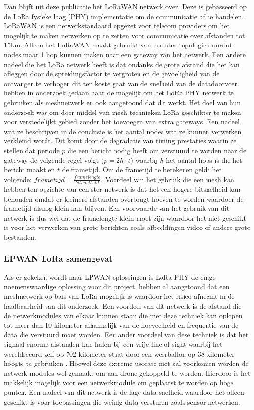 \documentclass[a4paper, 11pt, oneside]{report}
\begin{document}
Dan blijft uit deze publicatie het LoRaWAN netwerk over. 
Deze is gebasseerd op de LoRa fysieke laag (PHY)\cite{LoRAMOD} implementatie om de communicatie af te handelen.
LoRaWAN is een netwerkstandaard opgezet voor telecom providers om het mogelijk te maken netwerken op te zetten voor communicatie over afstanden tot 15km.
Alleen het LoRaWAN maakt gebruikt van een ster topologie doordat nodes maar 1 hop kunnen maken naar een gateway van het netwerk.
Een andere nadeel die het LoRa netwerk heeft is dat ondanks de grote afstand die het kan afleggen door de spreidingsfactor te vergroten en de gevoeligheid van de ontvanger te verhogen dit ten koste gaat van de snelheid van de datadoorvoer.
 hebben in onderzoek gedaan naar de mogelijk om het LoRa PHY netwerk te gebruiken als meshnetwerk en ook aangetoond dat dit werkt.
Het doel van hun onderzoek was om door middel van mesh technieken LoRa geschikter te maken voor verstedelijkt gebied zonder het toevoegen van extra gateways. 
Een nadeel wat ze beschrijven in de conclusie is het aantal nodes wat ze kunnen verwerken verkleind wordt.
Dit komt door de degradatie van timing prestaties waarin ze stellen dat periode $p$ die een bericht nodig heeft om verstuurd te worden naar de gateway de volgende regel volgt ($p = 2h\cdot t$) waarbij $h$ het aantal hops is die het bericht maakt en $t$ de frametijd. Om de frametijd te berekenen geldt het volgende: $frametijd = \frac{framelengte}{bitsnelheid}$. 
Voordeel van het gebruik die een mesh kan hebben ten opzichte van een ster netwerk is dat het een hogere bitsnelheid kan behouden omdat er kleinere afstanden overbrugt hoeven te worden waardoor de frametijd alsnog klein kan blijven.
Een voorwaarde van het gebruik van dit netwerk is dus wel dat de framelengte klein moet zijn waardoor het niet geschikt is voor het verwerken van grote berichten zoals afbeeldingen video of andere grote bestanden.

\subsubsection*{LPWAN LoRa samengevat}
Als er gekeken wordt naar LPWAN oplossingen is LoRa PHY de enige noemenswaardige oplossing voor dit project.
 hebben al aangetoond dat een meshnetwerk op bais van LoRa mogelijk is waardoor het risico afneemt in de haalbaarheid van dit onderzoek.
Een voordeel van dit netwerk is de afstand die de netwerkmodules van elkaar kunnen staan die met deze techniek kan oplopen tot meer dan 10 kilometer afhankelijk van de hoeveelheid en frequentie van de data die verstuurd moet worden.
Een ander voordeel van deze techniek is dat het signaal enorme afstanden kan halen bij een vrije line of sight waarbij het wereldrecord zelf op 702 kilometer staat door een weerballon op 38 kilometer hoogte te gebruiken \cite{LoRARecord}.
Hoewel deze extreme usecase niet zal voorkomen worden de netwerk modules wel gemaakt om aan drone gekoppeld te worden.
Hierdoor is het makkelijk mogelijk voor een netwerkmodule om geplaatst te worden op hoge punten. 
Een nadeel van dit netwerk is de lage data snelheid waardoor het alleen geschikt is voor toepassingen die weinig data versturen zoals sensor netwerken.
\end{document}
